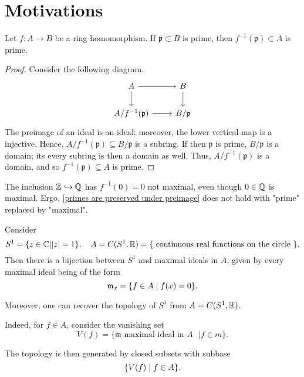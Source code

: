 \section{Motivations}

\begin{lemma}
  \label{primes are preserved under preimage}
  Let $f:A \to B$ be a ring homomorphism. If $\mathfrak p \subset B$ is prime, then $f^{-1}(\mathfrak p) \subset A$ is prime.
\end{lemma}

\begin{proof}
  Consider the following diagram.
  \begin{equation*}
  \begin{tikzcd}
    A \arrow[r] \arrow[d]
    & B \arrow[d] \\
    A /{ f^{-1}(\mathfrak p) } \arrow[r]
    & B /{\mathfrak p}
  \end{tikzcd}
\end{equation*}
The preimage of an ideal is an ideal; moreover, the lower vertical map is a injective. Hence,
  $A /{f^{-1}(\mathfrak p)} \subseteq B /{\mathfrak p}$
  is a subring. If then $\mathfrak p$ is prime, $B /{\mathfrak p}$ is a domain; its every subring is then a domain as well. Thus,
$A / {f^{-1}(\mathfrak p)}$
is a domain, and so
$f^{-1}(\mathfrak p) \subseteq A$
is prime.
\end{proof}

\begin{example}
The inclusion $\mathbb Z \hookrightarrow \mathbb Q$ has $f^{-1}(0) = 0$ not maximal, even though $0 \in \mathbb Q$ is maximal.
Ergo, \cref{primes are preserved under preimage} does not hold with "prime" replaced by "maximal".
\end{example}

\begin{example}
  \label{mot-circle}
  Consider
  \[ S^1 = \{ z \in \mathbb C | |z|=1 \}, \quad A = C(S^1, \mathbb R) = \{ \text{ continuous real functions on the circle } \}.\]
  Then there is a bijection between $S^1$ and maximal ideals in $A$, given by every maximal ideal being of the form
  \[\mathfrak m_x = \{ f \in A \mathrel{|} f(x) = 0 \} .\]

  Moreover, one can recover the topology of $S^1$ from $A = C(S^1, \mathbb R)$.

  Indeed, for $f \in A$, consider the vanishing set
  \[ V(f) = \{ \mathfrak m \text{ maximal ideal in $A$ } | f \in m \}.\]

  The topology is then generated by closed subsets with subbase
  \[\{V(f) \mathrel{|} f \in A\}.\]
\end{example}

